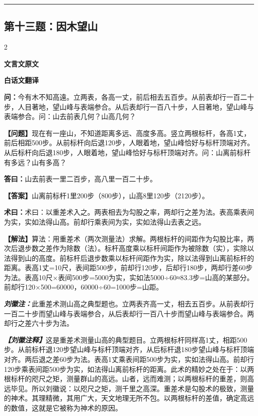 \documentclass[10pt,a4paper]{article}
\newcommand{\wen}[1]{\textbf{\color{problemcolor}问：}#1\par}
\newcommand{\da}[1]{\textbf{答曰：}#1\par}
\newcommand{\shu}[1]{\textbf{术曰：}#1\par}
\newcommand{\liuhui}[1]{{\color{commentarycolor}\textit{\textbf{刘徽注：}}#1\par}}
\newcommand{\classicalheader}[1]{{\centering\large\bfseries\color{classicalcolor} #1\par\vspace{0.5em}}}
\newcommand{\wenmodern}[1]{\textbf{\color{moderncolor}【问题】}#1\par}
\newcommand{\damodern}[1]{\textbf{【答案】}#1\par}
\newcommand{\shumodern}[1]{\textbf{【解法】}#1\par}
\newcommand{\liuhuimodern}[1]{{\color{commentarycolor}\textit{\textbf{【刘徽注释】}}#1\par}}
\newcommand{\modernheader}[1]{{\centering\large\bfseries\color{moderncolor} #1\par\vspace{0.5em}}}
\newcommand{\problemsec}[1]{\subsection*{#1}}
\begin{document}
\vspace{0.3cm}
\hrule
\vspace{0.3cm}

\problemsec{第十三题：因木望山}
\begin{paracol}{2}
\classicalheader{文言文原文}
\switchcolumn
\modernheader{白话文翻译}
\switchcolumn*

\wen{今有木不知高遠。立两表，各高一丈，前后相去五百步。从前表却行一百二十步，人目著地，望山峰与表端参合。从后表却行一百八十步，人目著地，望山峰与表端参合。问：山去前表几何？山高几何？}

\switchcolumn

\wenmodern{现在有一座山，不知道距离多远、高度多高。竖立两根标杆，各高1丈，前后相距500步。从前标杆向后退120步，人眼着地，望山峰恰好与标杆顶端对齐。从后标杆向后退180步，人眼着地，望山峰恰好与标杆顶端对齐。问：山离前标杆有多远？山有多高？}

\switchcolumn*

\da{山去前表一里二百步，高八里一百二十步。}

\switchcolumn

\damodern{山离前标杆1里200步（800步），山高8里120步（2120步）。}

\switchcolumn*

\shu{术曰：以重差术入之。两表相去为勾股之率，两却行之差为法。表高乘表间为实，实如法得山高。前却行乘表间为实，实如法得山去表之远。}

\switchcolumn

\shumodern{算法：用重差术（两次测量法）求解。两根标杆的间距作为勾股比率，两次后退步数之差作为除数（法）。标杆高度乘以标杆间距作为被除数（实），实除以法得到山的高度。前标杆后退步数乘以标杆间距作为实，除以法得到山离前标杆的距离。表高1丈=10尺，表间距500步，前却行120步，后却行180步，两却行差60步为法。表高10尺×表间500步=5000为实，实如法5000÷60≈83.3步=山高的某部分。前却行120×500=60000，60000÷60=1000步=山距。}

\switchcolumn*

\liuhui{此重差术测山高之典型题也。立两表齐高一丈，相去五百步。从前表却行一百二十步而望山峰与表端参合，从后表却行一百八十步而望山峰与表端参合。两却行之差六十步为法。}

\switchcolumn

\liuhuimodern{这是重差术测量山高的典型题目。立两根标杆同样高1丈，相距500步。从前标杆退120步望山峰与标杆顶端对齐，从后标杆退180步望山峰与标杆顶端对齐。两后退之差60步为法。表高1丈乘表间距500步为实，实如法得山高。前却行120步乘表间距500步为实，如法得山离前标杆的距离。此术的精妙之处在于：以两根标杆的咫尺之矩，测量群山的高远。山者，远而难测；以两根标杆的重差，则高远毕见。所以刘徽说：以咫尺之矩，测千里之高深。重差术是勾股术的极致，测量的神术。其理精微，其用广大，天文地理无所不包。以两根标杆的差值，确定高远的数值，这就是它被称为神术的原因。}

\end{paracol}
\end{document}
